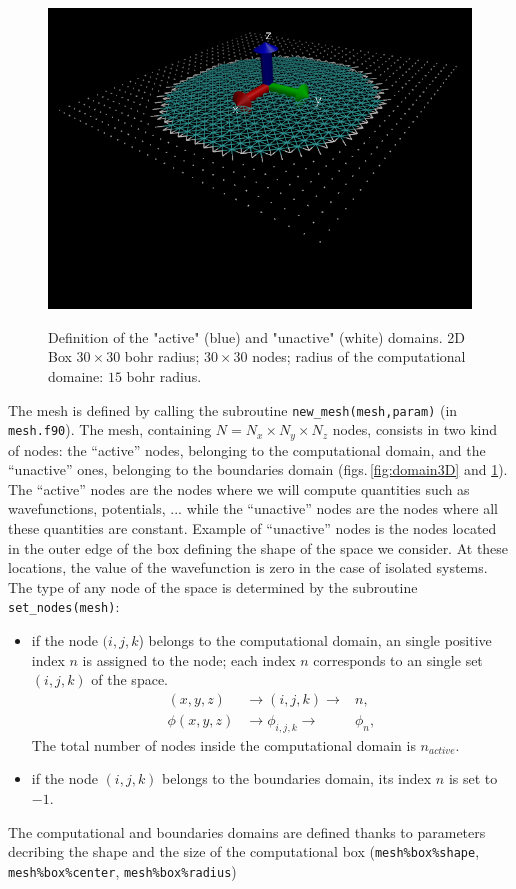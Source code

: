 \documentclass[11pt,a4paper]{article}
\begin{document}
\begin{figure}
  \centering
  {\includegraphics[scale=0.29]{circle.png}}
  \caption{Definition of the "active" (blue) and "unactive" (white) domains. 2D Box $30\times 30$ bohr radius; $30 \times 30$ nodes; radius of the computational domaine: $15$ bohr radius.}
  \label{fig:domain2D}
\end{figure}
The mesh is defined by calling the subroutine \verb+new_mesh(mesh,param)+ (in \verb+mesh.f90+).
The mesh, containing $N=N_x\times N_y\times N_z$ nodes, consists in two kind of nodes: the ``active'' nodes, belonging to the computational domain, and the ``unactive'' ones, belonging to the boundaries domain (figs.\,\ref{fig:domain3D} and \ref{fig:domain2D}). The ``active'' nodes are the nodes where we will compute quantities such as wavefunctions, potentials, ... while the ``unactive'' nodes are the nodes where all these quantities are constant.
Example of ``unactive'' nodes is the nodes located in the outer edge of the box defining the shape of the space we consider. At these locations, the value of the wavefunction is zero in the case of isolated systems.
The type of any node of the space is determined by the subroutine \verb+set_nodes(mesh)+:
\begin{itemize}
\item if the node $(i,j,k$) belongs to the computational domain, an single positive index $n$ is assigned to the node; each index $n$ corresponds to an single set $(i,j,k)$ of the space.
  \begin{eqnarray}
  (x,y,z)    &\rightarrow (i,j,k)    \rightarrow & n, \\
  \phi(x,y,z)&\rightarrow \phi_{i,j,k}\rightarrow & \phi_n, 
\end{eqnarray}
The total number of nodes inside the computational domain is $n_{active}$.

  \item if the node $(i,j,k)$ belongs to the boundaries domain, its index $n$ is set to $-1$.
\end{itemize}
The computational and boundaries domains are defined thanks to parameters decribing the shape  and the size of the computational box (\verb+mesh%box%shape+, \verb+mesh%box%center+, \verb+mesh%box%radius+)
\end{document}
